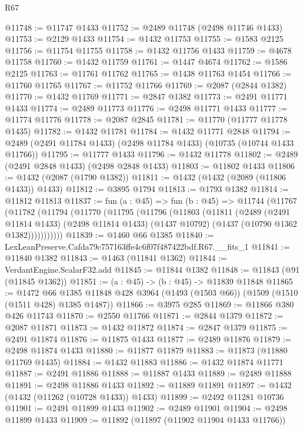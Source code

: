 \begin{lexlean}{R67}
\begin{coremodule}
@11748 := @11747 @1433
@11752 := @2489 @11748 (@2498 @11746 @1433)
@11753 := @2129 @1433
@11754 := @1432 @11753
@11755 := @1583 @2125
@11756 := @11754 @11755
@11758 := @1432 @11756 @1433
@11759 := @4678 @11758
@11760 := @1432 @11759
@11761 := @1447 @4674
@11762 := @1586 @2125
@11763 := @11761 @11762
@11765 := @1438 @11763 @1454
@11766 := @11760 @11765
@11767 := @11752 @11766
@11769 := @2087 (@2844 @1382)
@11770 := @1432 @11769
@11771 := @2847 @1382
@11773 := @2491 @11771 @1433
@11774 := @2489 @11773
@11776 := @2498 @11771 @1433
@11777 := @11774 @11776
@11778 := @2087 @2845
@11781 := @11770 (@11777 @11778 @1435)
@11782 := @1432 @11781
@11784 := @1432 @11771 @2848
@11794 := @2489 (@2491 @11784 @1433) (@2498 @11784 @1433) (@10735 (@10744 @1433 @11766))
@11795 := @11777 @1433
@11796 := @1432 @11778
@11802 := @2489 (@2491 @2848 @1433) (@2498 @2848 @1433)
@11803 := @11802 @1433
@11806 := @1432 (@2087 (@1790 @1382))
@11811 := @1432 (@1432 (@2089 (@11806 @1433)) @1433)
@11812 := @3895 @1794
@11813 := @1793 @1382
@11814 := @11812 @11813
@11837 := fun (a : @45) =>
  fun (b : @45) =>
  @11744
    (@11767
      (@11782
        (@11794
          (@11770
            (@11795
              (@11796
                (@11803
                  (@11811
                    (@2489
                      (@2491 @11814 @1433)
                      (@2498 @11814 @1433)
                      (@1437 @10792)
                      (@1437 (@10790 @1362 @1382)))))))))))
@11839 := @1460 @66 @1385
@11840 := LexLeanPreserve.Cafda79c757163ffe4c6f07f487422bdf.R67.__fits_1
@11841 := @11840 @1382
@11843 := @1463 (@11841 @1362)
@11844 := VerdantEngine.ScalarF32.add
@11845 := @11844 @1382
@11848 := @11843 (@91 (@11845 @1362))
@11851 := (a : @45) -> (b : @45) -> @11839 @11848
@11865 := @1472
    @66
    @1385
    @11848
    @428
    @3964
    (@1493 (@1503 @66))
    (@1509 (@1510 (@1511 @428) @1385 @1487))
@11866 := @3975 @285
@11869 := @11866 @380 @426 @11743
@11870 := @2550 @11766
@11871 := @2844 @1379
@11872 := @2087 @11871
@11873 := @1432 @11872
@11874 := @2847 @1379
@11875 := @2491 @11874
@11876 := @11875 @1433
@11877 := @2489 @11876
@11879 := @2498 @11874 @1433
@11880 := @11877 @11879
@11883 := @11873 (@11880 @11769 @1435)
@11884 := @1432 @11883
@11886 := @1432 @11874 @11771
@11887 := @2491 @11886
@11888 := @11887 @1433
@11889 := @2489 @11888
@11891 := @2498 @11886 @1433
@11892 := @11889 @11891
@11897 := @1432 (@1432 (@11262 (@10728 @1433)) @1433)
@11899 := @2492 @11281 @10736
@11901 := @2491 @11899 @1433
@11902 := @2489 @11901
@11904 := @2498 @11899 @1433
@11909 := @11892 (@11897 (@11902 @11904 @1433 @11766))

\end{coremodule}
\end{lexlean}
